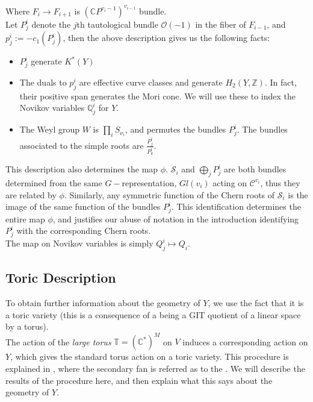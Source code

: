 \documentclass[11pt,letterpaper]{amsart}
\begin{document}
Where $F_i\to F_{i+1}$ is $(\mathbb{C}P^{v_i-1})^{v_{i-1}}$ bundle.  \\

Let $P^i_j$ denote the $j$th tautological bundle $\mathcal{O}(-1)$ in the fiber of $F_{i-1}$, and $p^i_j:=-c_1(P^i_j)$, then the above description gives us the following facts:

\begin{itemize}
    \item $P^i_j$ generate $K^*(Y)$
    \item The duals to $p^i_j$ are effective curve classes and generate $H_2(Y,\mathbb{Z})$. In fact, their positive span generates the Mori cone. We will use these to index the Novikov variables $\mathbb{Q}^i_j$ for $Y$. 
    \item The Weyl group $W$ is $\prod_i S_{\nu_i}$, and permutes the bundles $P^i_j$. The bundles associated to the simple roots are $\frac{P^i_j}{P^i_k}$. 
    
\end{itemize}

This description also determines the map $\phi$. $\mathcal{S}_i$ and $\bigoplus_j P^i_j$ are both bundles determined from the same $G-$representation, $Gl(v_i)$ acting on $\mathcal{C}^{v_i}$, thus they are related by $\phi$. Similarly, any symmetric function of the Chern roots of $\mathcal{S}_i$ is the image of the same function of the bundles $P_j^i$. This identification determines the entire map $\phi$, and justifies our abuse of notation in the introduction identifying $P_j^i$ with the corresponding Chern roots.\\

The map on Novikov variables is simply $Q^i_j\mapsto Q_i$. 

\subsection{Toric Description}
To obtain further information about the geometry of $Y$, we use the fact that it is a toric variety (this is a consequence of a being a GIT quotient of a linear space by a torus). \\

The action of the \emph{large torus} $\mathbb{T}=(\mathbb{C}^*)^M$ on $V$ induces a corresponding action on $Y$, which gives the standard torus action on a toric variety. This procedure is explained in \cite{givtor}, where the secondary fan is referred as to the . We will describe the results of the procedure here, and then explain what this says about the geometry of $Y$.
\end{document}
